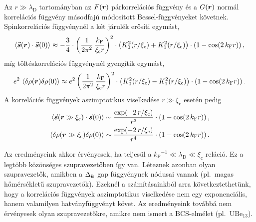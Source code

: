 \documentclass[a4paper,12pt,titlepage]{article}
\newcommand{\KK}{{\vb*{k}}}
\newcommand{\RR}{{\vb*{r}}}
\newcommand{\kF}{{k_\text{F}}}
\newcommand{\xic}{{\xi_\text{c}}}
\begin{document}
Az $r \gg \lambda_\text{D}$ tartományban az $F(\RR)$ párkorrelációs függvény és a $G(\RR)$ normál korrelációs függvény másodfajú módosított Bessel-függvényeket követnek.  Spinkorrelációs függvénynél a két járulék erősíti egymást,
\begin{equation}
	\expval{\va*{s}(\RR) \cdot \va*{s}(0)} \approx -\frac{3}{4} \cdot \left( \frac{1}{2 \pi^2} \, \frac{\kF}{\xic r} \right)^2 \cdot \left( K_0^2(r / \xic) + K_1^2(r / \xic) \right) \cdot \left( 1 - \cos(2 \, \kF r) \right),
\end{equation}
míg töltéskorrelációs függvénynél gyengítik egymást,
\begin{equation}
	e^2 \, \expval{\delta\rho(\RR) \delta\rho(0)} \approx e^2 \left( \frac{1}{2 \pi^2} \, \frac{\kF}{\xic r} \right)^2 \cdot \left( K_0^2(r / \xic) - K_1^2(r / \xic) \right) \cdot \left( 1 - \cos(2 \, \kF r) \right).
\end{equation}
A korrelációs függvények aszimptotikus viselkedése $r \gg \xic$ esetén pedig
\begin{equation}
\begin{split}
	\expval{\va*{s}(\RR \gg \xic) \cdot \va*{s}(0)} & \sim \frac{\exp(-2 \, r / \xic)}{r^3} \cdot \left( 1 - \cos(2 \, \kF r) \right), \\
	\expval{\delta\rho(\RR \gg \xic) \delta\rho(0)} & \sim \frac{\exp(-2 \, r / \xic)}{r^4} \cdot \left( 1 - \cos(2 \, \kF r) \right).
\end{split}
\end{equation}

Az eredményeink akkor érvényesek, ha teljesül a $\kF^{-1} \ll \lambda_\text{D} \ll \xic$ reláció.  Ez a legtöbb közönséges szupravezetőben így van.  Léteznek azonban olyan szupravezetők, amikben a $\Delta_\KK$ gap függvénynek nódusai vannak (pl.\ magas hőmérsékletű szupravezetők).  Ezeknél a számításainkból arra következtethetünk, hogy a korrelációs függvények aszimptotikus viselkedése nem egy exponenciális, hanem valamilyen hatványfüggvényt követ.  Az eredményeink továbbá nem érvényesek olyan szupravezetőkre, amikre nem ismert a BCS-elmélet (pl.\ $\mathrm{U}\mathrm{Be}_{13}$).



\end{document}
